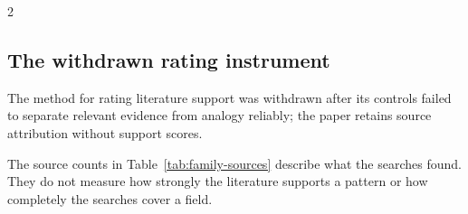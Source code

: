 \begin{multicols}{2}
\subsection{The withdrawn rating instrument}

The method for rating literature support was withdrawn after its controls failed to separate relevant evidence from analogy reliably; the paper retains source attribution without support scores.

The source counts in Table~\ref{tab:family-sources} describe what the searches found. They do not measure how strongly the literature supports a pattern or how completely the searches cover a field.
\end{multicols}
